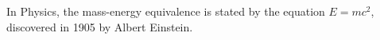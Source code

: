 \documentclass{article}
\begin{document}
In Physics, the mass-energy equivalence is stated by the equation $E=mc^2$, discovered in 1905 by Albert Einstein.
\end{document}
